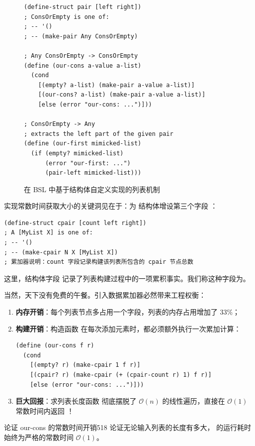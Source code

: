 \begin{figure}[htbp]
  \centering
\begin{lstlisting}[language=BSL, basicstyle=\scriptsize\ttfamily]
(define-struct pair [left right])
; ConsOrEmpty is one of:
; -- '()
; -- (make-pair Any ConsOrEmpty)

; Any ConsOrEmpty -> ConsOrEmpty
(define (our-cons a-value a-list)
  (cond
    [(empty? a-list) (make-pair a-value a-list)]
    [(our-cons? a-list) (make-pair a-value a-list)]
    [else (error "our-cons: ...")]))

; ConsOrEmpty -> Any
; extracts the left part of the given pair
(define (our-first mimicked-list)
  (if (empty? mimicked-list)
      (error "our-first: ...")
      (pair-left mimicked-list)))
\end{lstlisting}
  \caption{在 BSL 中基于结构体自定义实现的列表机制}
  \label{fig:189}
\end{figure}

实现常数时间获取大小的关键洞见在于：为  结构体增设第三个字段 ：

\begin{lstlisting}[language=BSL]
(define-struct cpair [count left right])
; A [MyList X] is one of:
; -- '()
; -- (make-cpair N X [MyList X])
; 累加器说明：count 字段记录构建该列表所包含的 cpair 节点总数
\end{lstlisting}

这里，结构体字段  记录了列表构建过程中的一项累积事实。我们称这种字段为。

当然，天下没有免费的午餐。引入数据累加器必然带来工程权衡：
\begin{enumerate}
  \item \textbf{内存开销}：每个列表节点多占用一个字段，列表的内存占用增加了 33\%；
  \item \textbf{构建开销}：构造函数  在每次添加元素时，都必须额外执行一次累加计算：
\begin{lstlisting}[language=BSL]
(define (our-cons f r)
  (cond
    [(empty? r) (make-cpair 1 f r)]
    [(cpair? r) (make-cpair (+ (cpair-count r) 1) f r)]
    [else (error "our-cons: ...")]))
\end{lstlisting}
  \item \textbf{巨大回报}：求列表长度函数  彻底摆脱了 $\mathcal{O}(n)$ 的线性遍历，直接在 $\mathcal{O}(1)$ 常数时间内返回 ！
\end{enumerate}

\begin{exercise}{论证 our-cons 的常数时间开销}{518}
论证无论输入列表的长度有多大， 的运行耗时始终为严格的常数时间 $\mathcal{O}(1)$。
\end{exercise}


